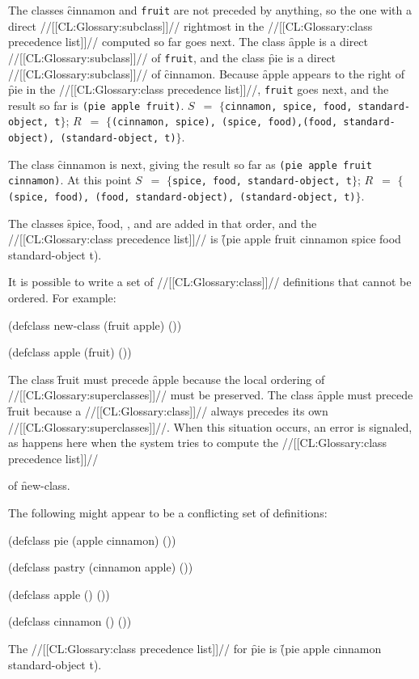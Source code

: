 The classes \f{cinnamon} and {\tt fruit} are not preceded by anything, so the one with a direct //[[CL:Glossary:subclass]]// rightmost in the  //[[CL:Glossary:class precedence list]]// computed so far goes next.  The class \f{apple} is a direct //[[CL:Glossary:subclass]]// of {\tt fruit}, and the class \f{pie} is a direct //[[CL:Glossary:subclass]]// of \f{cinnamon}.  Because \f{apple} appears to the right of \f{pie} in the //[[CL:Glossary:class precedence list]]//,  {\tt fruit} goes next, and the result so far is {\tt (pie apple fruit)}.  $S$~$=$ $\{${\tt cinnamon, spice, food, standard-object, t}$\}$; $R$~$=$ $\{${\tt (cinnamon, spice), (spice, food),\hfil\break (food, standard-object), (standard-object, t)}$\}$.

The class \f{cinnamon} is next, giving the result so far as {\tt (pie apple fruit cinnamon)}.  At this point $S$~$=$ $\{${\tt spice, food, standard-object, t}$\}$; $R$~$=$ $\{${\tt (spice, food), (food, standard-object), (standard-object, t)}$\}$.

The classes \f{spice}, \f{food}, , and   are added in that order, and the //[[CL:Glossary:class precedence list]]//  is \f{(pie apple fruit cinnamon spice food standard-object t)}.

It is possible to write a set of //[[CL:Glossary:class]]// definitions that cannot be  ordered.   For example: 

\code
 (defclass new-class (fruit apple) ())
 
 (defclass apple (fruit) ()) \endcode

The class \f{fruit} must precede \f{apple}  because the local ordering of //[[CL:Glossary:superclasses]]// must be preserved. The class \f{apple} must precede \f{fruit}  because a //[[CL:Glossary:class]]// always precedes its own //[[CL:Glossary:superclasses]]//. When this situation occurs, an error is signaled, as happens here when the system tries to compute the //[[CL:Glossary:class precedence list]]// 

of \f{new-class}.

The following might appear to be a conflicting set of definitions:

\code
 (defclass pie (apple cinnamon) ())
 
 (defclass pastry (cinnamon apple) ())
 
 (defclass apple () ())
 
 (defclass cinnamon () ()) \endcode

The //[[CL:Glossary:class precedence list]]// for \f{pie} is  \f{(pie apple cinnamon standard-object t)}.

